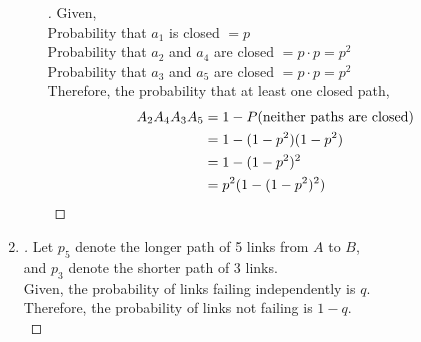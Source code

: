 \documentclass[paper=usletter, fontsize=12pt]{article}
\begin{document}
\begin{enumerate}
\begin{enumerate}
\begin{proof}[\unskip\nopunct]
                    Given,\\
                    Probability that $a_1$ is closed $=p$\\
                    Probability that $a_2$ and $a_4$ are closed $= p \cdot p = p^2$\\
                    Probability that $a_3$ and $a_5$ are closed $= p \cdot p = p^2$\\
                    Therefore, the probability that at least one closed path,
                    \begin{align*}
                        A_2A_4A_3A_5 & = 1-P(\text{neither paths are closed})\\
                        & = 1-(1-p^2)(1-p^2)\\
                        & = 1-(1-p^2)^2 \\
                        & = p^2(1-(1-p^2)^2) \qedhere
                    \end{align*}

                \end{proof}
                \vspace{0.2in}

            \end{enumerate}

        \item
        \begin{proof}[\unskip\nopunct]
            Let $p_5$ denote the longer path of 5 links from $A$ to $B$,\\
            and $p_3$ denote the shorter path of 3 links. \\

            Given, the probability of links failing independently is $q$.\\
            Therefore, the probability of links not failing is $1-q$. \\


\end{proof}
\end{enumerate}
\end{document}
